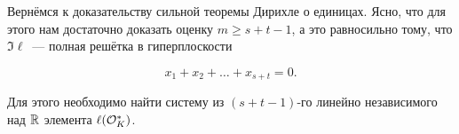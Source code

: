
	Вернёмся к доказательству сильной теоремы Дирихле о единицах. Ясно, что для этого нам достаточно доказать оценку $m \ge s + t - 1$, а это равносильно тому, что $\Im{\ell}$~--- полная решётка в гиперплоскости 

	\[
			x_1 + x_2 + \ldots + x_{s + t} = 0.
	\]

	Для этого необходимо найти систему из $(s + t - 1)$-го линейно независимого над $\mathbb{R}$ элемента $\ell\lr*{\cO_{K}^{*}}$. 

	